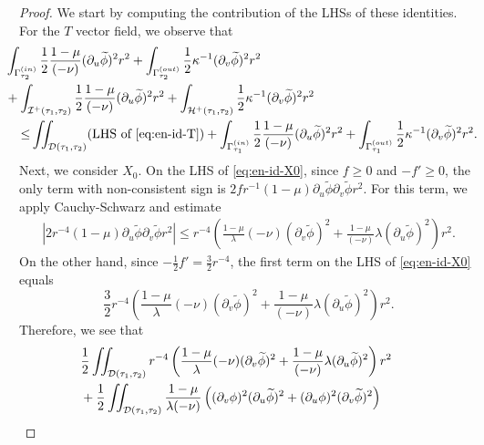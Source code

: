 \documentclass[10pt, reqno]{amsart}
\theoremstyle{definition}
\theoremstyle{remark}
\theoremstyle{conjecture}
\numberwithin{equation}{section}
\newcommand{\rd}{\partial}
\newcommand{\0}{\emptyset}
\newcommand{\Gmm}{\Gamma}
\newcommand{\kpp}{\kappa}
\newcommand{\lmb}{\lambda}
\newcommand{\calD}{\mathcal D}
\newcommand{\calH}{\mathcal H}
\newcommand{\calI}{\mathcal I}
\newcommand{\dur}{\nu}
\newcommand{\dvr}{\lmb}
\newcommand{\EH}{\calH^{+}}
\newcommand{\NI}{\calI^{+}}						%
\newcommand{\phibg}{\overline{\phi}}				%
\newcommand{\phidf}{\widetilde{\phi}}				%
\newcommand{\Abs}[1]{\left\vert #1 \right\vert}
\begin{document}
\begin{proof}
We start by computing the contribution of the LHSs of these identities. For the $T$ vector field, we observe that
\begin{equation} \label{eq:en-w-ctrl-T}
\begin{aligned}
& \hskip-2em
	\int_{\Gmm^{(in)}_{\tau_{2}}} \frac{1}{2} \frac{1-\mu}{(-\dur)} (\rd_{u} \phidf)^{2} r^{2} 
	+ \int_{\Gmm^{(out)}_{\tau_{2}}} \frac{1}{2} \kpp^{-1} (\rd_{v} \phidf)^{2} r^{2} \\
& \hskip-2em
	+ \int_{\NI(\tau_{1}, \tau_{2})} \frac{1}{2} \frac{1-\mu}{(-\dur)} (\rd_{u} \phidf)^{2} r^{2} 
	+ \int_{\EH(\tau_{1}, \tau_{2})} \frac{1}{2} \kpp^{-1} (\rd_{v} \phidf)^{2} r^{2}  \\
	\leq & \iint_{\calD(\tau_{1}, \tau_{2})} (\hbox{LHS of \eqref{eq:en-id-T}})
	+\int_{\Gmm^{(in)}_{\tau_{1}}} \frac{1}{2} \frac{1-\mu}{(-\dur)} (\rd_{u} \phidf)^{2} r^{2} 
	+\int_{\Gmm^{(out)}_{\tau_{1}}} \frac{1}{2} \kpp^{-1} (\rd_{v} \phidf)^{2} r^{2} .
\end{aligned}
\end{equation}
Next, we consider $X_{0}$. On the LHS of \eqref{eq:en-id-X0}, since $f \geq 0$ and $- f' \geq 0$, the only term with non-consistent sign is $2 f r^{-1} (1-\mu)  \rd_{u} \phidf \rd_{v} \phidf r^{2}$. For this term, we apply Cauchy-Schwarz and estimate
\begin{align*}
	\Abs{2 r^{-4} (1-\mu) \rd_{u} \phidf \rd_{v} \phidf r^{2}}
	\leq r^{-4} \left( \frac{1-\mu}{\dvr} (-\dur) (\rd_{v} \phidf)^{2} 
		+ \frac{1-\mu}{(-\dur)} \dvr (\rd_{u} \phidf)^{2} \right) r^{2}.
\end{align*}
On the other hand, since $- \frac{1}{2} f' = \frac{3}{2} r^{-4}$, the first term on the LHS of \eqref{eq:en-id-X0} equals
\begin{equation*}
	\frac{3}{2} r^{-4} \left( \frac{1-\mu}{\dvr} (-\dur) (\rd_{v} \phidf)^{2} 
		+ \frac{1-\mu}{(-\dur)} \dvr (\rd_{u} \phidf)^{2} \right) r^{2}.
\end{equation*}
Therefore, we see that
\begin{equation} \label{eq:en-w-ctrl-X}
\begin{aligned}
& \hskip-2em
	\frac{1}{2} \iint_{\calD(\tau_{1}, \tau_{2})} r^{-4} \left( \frac{1-\mu}{\dvr} (-\dur) (\rd_{v} \phidf)^{2} 
		+ \frac{1-\mu}{(-\dur)} \dvr (\rd_{u} \phidf)^{2} \right) r^{2} \\
& \hskip-2em
	+ \frac{1}{2} \iint_{\calD(\tau_{1}, \tau_{2})} \frac{1-\mu}{\dvr (-\dur)} \left((\rd_{v} \phi)^{2} (\rd_{u} \phidf)^{2} + (\rd_{u} \phi)^{2} (\rd_{v} \phidf)^{2} \right) \\

\end{aligned}
\end{equation}
\end{proof}
\end{document}
